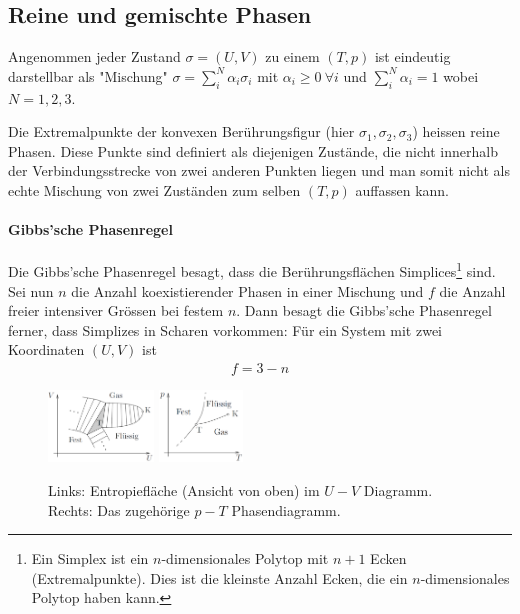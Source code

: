 \subsection{Reine und gemischte Phasen}

Angenommen jeder Zustand $\sigma = (U,V)$ zu einem $(T,p)$ ist eindeutig
darstellbar als "Mischung" $\sigma = \sum_{i}^N \alpha_i \sigma_i$ mit $\alpha_i
\geq 0 \ \forall i$ und $\sum_{i}^N \alpha_i = 1$ wobei $N=1,2,3$.

Die Extremalpunkte der konvexen Berührungsfigur (hier $\sigma_1,\sigma_2,
\sigma_3$) heissen reine Phasen. Diese Punkte sind definiert als diejenigen
Zustände, die nicht innerhalb der Verbindungsstrecke von zwei anderen Punkten
liegen und man somit nicht als echte Mischung von zwei Zuständen zum selben
$(T,p)$ auffassen kann.

\paragraph{Gibbs'sche Phasenregel}

Die Gibbs'sche Phasenregel besagt, dass die Berührungsflächen
Simplices\footnote{Ein Simplex ist ein $n$-dimensionales Polytop mit
$n+1$ Ecken (Extremalpunkte). Dies ist die kleinste Anzahl Ecken, die
ein $n$-dimensionales Polytop haben kann.} sind. Sei nun $n$ die Anzahl
koexistierender Phasen in einer Mischung und $f$ die Anzahl freier intensiver
Grössen bei festem $n$. Dann besagt die Gibbs'sche Phasenregel ferner, dass
Simplizes in Scharen vorkommen: Für ein System mit zwei Koordinaten $(U,V)$
ist
\begin{align*}
    f = 3 - n
\end{align*}

\begin{figure}[h]
    \centering
    \includegraphics[width=0.25\textwidth]{Bilder/Gibbs_UV.png}
    \includegraphics[width=0.2\textwidth]{Bilder/Gibbs_Tp.png}
    \caption{Links: Entropiefläche (Ansicht von oben) im $U-V$ Diagramm.
        Rechts: Das zugehörige $p-T$ Phasendiagramm.}
    \label{Gibbs}
\end{figure}

